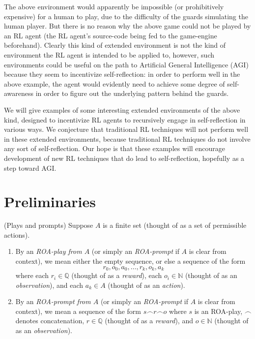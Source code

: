 \documentclass[runningheads]{llncs}
\begin{document}
The above environment would apparently be impossible (or prohibitively expensive)
for a human to play, due to the difficulty of the guards simulating the human player.
But there is no reason why the above game could not be played by an RL agent (the
RL agent's source-code being fed to the game-engine beforehand). Clearly this kind of
extended environment is not the kind of environment the RL agent is intended to be
applied to, however, such environments could be useful on the path to Artificial
General Intelligence (AGI) because they seem to incentivize self-reflection: in order
to perform well in the above example, the agent would evidently need to achieve some
degree of self-awareness in order to figure out the underlying pattern behind the
guards.

We will give examples of some interesting
extended environments of the above kind, designed to incentivize RL agents to
recursively engage in self-reflection in various ways.
We conjecture that traditional RL techniques will not perform well in these extended
environments, because traditional RL techniques do not involve any sort of
self-reflection. Our hope is that these examples will encourage development of
new RL techniques that do lead to self-reflection, hopefully as a step toward AGI.

\section{Preliminaries}

\begin{definition}
(Plays and prompts)
    Suppose $A$ is a finite set (thought of as a set of permissible actions).
    \begin{enumerate}
        \item
        By an \emph{ROA-play from $A$} (or simply an \emph{ROA-prompt} if $A$
        is clear from context), we mean either the empty sequence,
        or else a sequence of the form
        \[
            r_0,o_0,a_0,\ldots,r_k,o_k,a_k
        \]
        where each $r_i\in\mathbb Q$ (thought of as a \emph{reward}),
        each $o_i\in\mathbb N$ (thought of as an \emph{observation}),
        and each $a_k\in A$ (thought of as an \emph{action}).
        \item
        By an \emph{ROA-prompt from $A$} (or simply an \emph{ROA-prompt} if $A$
        is clear from context), we mean a sequence of the form
        $s\frown r\frown o$
        where $s$ is an ROA-play, $\frown$ denotes concatenation,
        $r\in\mathbb Q$ (thought of as a \emph{reward}),
        and $o\in\mathbb N$ (thought of as an \emph{observation}).
    \end{enumerate}
\end{definition}
\end{document}

